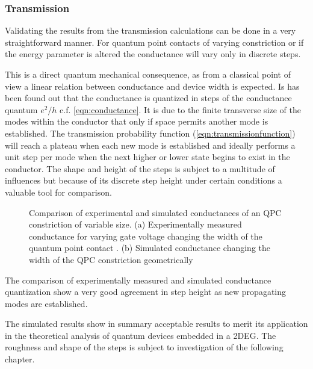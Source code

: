 \subsubsection{Transmission}
Validating the results from the transmission calculations can be done in a very straightforward manner. For quantum point contacts of varying constriction or if the energy parameter is altered the conductance will vary only in discrete steps.\par
This is a direct quantum mechanical consequence, as from a classical point of view a linear relation between conductance and device width is expected.
Is has been found out that the conductance is quantized in steps of the conductance quantum $e^2/h$ c.f. \cref{eqn:conductance}.
It is due to the finite transverse size of the modes within the conductor that only if space permits another mode is established. The transmission probability function (\cref{eqn:transmissionfunction}) will reach a plateau when each new mode is established and ideally performs a unit step per mode when the next higher or lower state begins to exist in the conductor. The shape and height of the steps is subject to a multitude of influences but because of its discrete step height under certain conditions a valuable tool for comparison.\par
\begin{figure}[h]
  \begin{center}
    \caption{Comparison of experimental and simulated conductances of an QPC constriction of variable size. (a) Experimentally measured conductance for varying gate voltage changing the width of the quantum point contact \cite{PhysRevLett.60.848}. (b) Simulated conductance changing the width of the QPC constriction geometrically}
\end{center}
\end{figure}
The comparison of experimentally measured and simulated conductance quantization show a very good agreement in step height as new propagating modes are established.\par
The simulated results show in summary acceptable results to merit its application in the theoretical analysis of quantum devices embedded in a 2DEG.
The roughness and shape of the steps is subject to investigation of the following chapter.\par
\FloatBarrier
